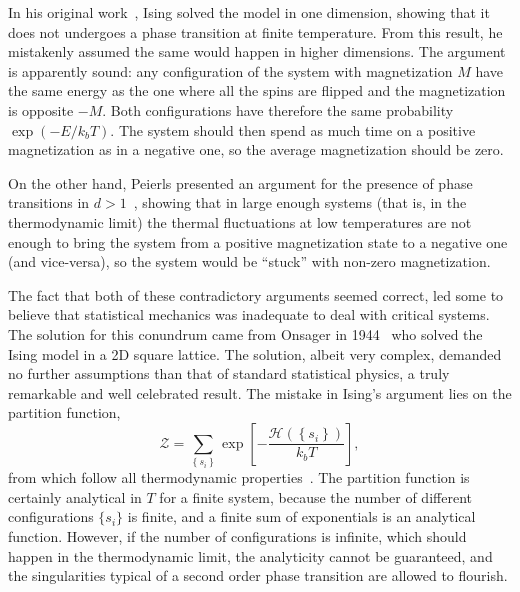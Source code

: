 In his original work~\cite{Ising1925}, Ising solved the model in one dimension,
showing that it does not undergoes a phase transition at finite temperature.
From this result, he mistakenly assumed the same would happen in higher
dimensions. The argument is apparently sound: any configuration of the system
with magnetization $M$ have the same energy as the one where all the spins are
flipped and the magnetization is opposite $-M$. Both configurations have
therefore the same probability $\exp(-E/k_b T)$. The system should then spend
as much time on a positive magnetization as in a negative one, so the average
magnetization should be zero.

On the other hand, Peierls presented an argument for the presence of phase
transitions in $d>1$~\cite{Peierls1936}, showing that in large enough systems
(that is, in the thermodynamic limit) the thermal fluctuations at low
temperatures are not enough to bring the system from a positive magnetization
state to a negative one (and vice-versa), so the system would be ``stuck''
with non-zero magnetization.

The fact that both of these contradictory arguments seemed correct, led some to
believe that statistical mechanics was inadequate to deal with critical
systems. The solution for this conundrum came from Onsager in
1944~\cite{Onsager1944} who solved the Ising model in a 2D square lattice. The
solution, albeit very complex, demanded no further assumptions than that of
standard statistical physics, a truly remarkable and well celebrated result.
The mistake in Ising's argument lies on the partition function,
\begin{equation}
    \mathcal{Z}=
    \sum_{\left\{ s_{i}\right\} }
    \exp\left[
        -\frac{\mathcal{H}\left(\left\{ s_{i}\right\} \right)}{k_{b}T}
    \right],
\end{equation}
from which follow all thermodynamic properties~\cite{Pathria1996}. The
partition function is certainly analytical in $T$ for a finite system, because
the number of different configurations $\{s_i\}$ is finite, and a finite sum of
exponentials is an analytical function. However, if the number of
configurations is infinite, which should happen in the thermodynamic limit, the
analyticity cannot be guaranteed, and the singularities typical of a second
order phase transition are allowed to flourish.

